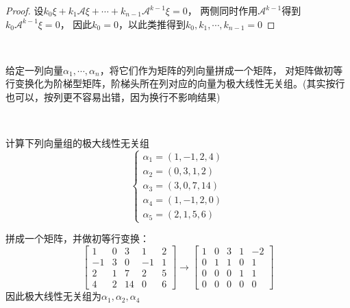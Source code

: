\begin{proof}
  设$k_0 \xi + k_1\mathcal{A} \xi + \cdots + k_{n-1}\mathcal{A}^{k-1} \xi = 0$，
  两侧同时作用$\mathcal{A}^{k-1}$得到$k_0\mathcal{A}^{k-1}\xi = 0$，
  因此$k_0 = 0$，以此类推得到$k_0,k_1,\cdots,k_{n-1} = 0$
\end{proof}

~

\begin{theorem}[极大线性无关组的计算]
  给定一列向量$\alpha_1,\cdots,\alpha_n$，将它们作为矩阵的列向量拼成一个矩阵，
  对矩阵做初等行变换化为阶梯型矩阵，阶梯头所在列对应的向量为极大线性无关组。(其实按行也可以，按列更不容易出错，因为换行不影响结果)
\end{theorem}

~

\begin{exercise}[极大线性无关组的计算]
  计算下列向量组的极大线性无关组
  \begin{equation*}
    \begin{cases}
      \alpha_1 = (1,-1,2,4)\\
      \alpha_2 = (0,3,1,2)\\
      \alpha_3 = (3,0,7,14)\\
      \alpha_4 = (1,-1,2,0)\\
      \alpha_5 = (2,1,5,6)
    \end{cases}
  \end{equation*}
\end{exercise}

\begin{solution}
  拼成一个矩阵，并做初等行变换：
  \begin{equation*}
    \left[
      \begin{array}{ccccc}
        1&0&3&1&2\\ 
        -1&3&0&-1&1 \\
         2&1&7&2&5 \\
         4&2&14&0&6
      \end{array}
    \right] \rightarrow \left[
      \begin{array}{ccccc}
        1&0&3&1&-2 \\
         0&1&1&0&1 \\
         0&0&0&1&1 \\
         0&0&0&0&0
      \end{array}
    \right]
  \end{equation*}
  因此极大线性无关组为$\alpha_1, \alpha_2, \alpha_4$
\end{solution}

